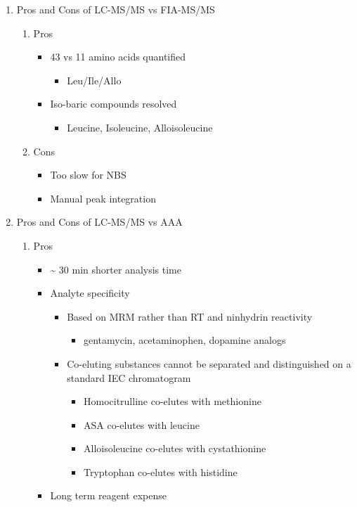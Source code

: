 \documentclass{scrartcl}
\begin{document}
\begin{enumerate}
\item Pros and Cons of LC-MS/MS vs FIA-MS/MS
\label{sec:org7e2c789}
\begin{enumerate}
\item Pros
\label{sec:orga2e049b}
\begin{itemize}
\item 43 vs 11 amino acids quantified
\begin{itemize}
\item Leu/Ile/Allo
\end{itemize}
\item Iso-baric compounds resolved
\begin{itemize}
\item Leucine, Isoleucine, Alloisoleucine
\end{itemize}
\end{itemize}
\item Cons
\label{sec:org9453c33}
\begin{itemize}
\item Too slow for NBS
\item Manual peak integration
\end{itemize}
\end{enumerate}
\item Pros and Cons of LC-MS/MS vs AAA
\label{sec:orgd8c99fc}
\begin{enumerate}
\item Pros
\label{sec:orgb28c6ec}
\begin{itemize}
\item \textasciitilde{} 30 min shorter analysis time
\item Analyte specificity
\begin{itemize}
\item Based on MRM rather than RT and ninhydrin reactivity
\begin{itemize}
\item gentamycin, acetaminophen, dopamine analogs
\end{itemize}
\item Co-eluting substances cannot be separated and distinguished on a
standard IEC chromatogram
\begin{itemize}
\item Homocitrulline co-elutes with methionine
\item ASA co-elutes with leucine
\item Alloisoleucine co-elutes with cystathionine
\item Tryptophan co-elutes with histidine
\end{itemize}
\end{itemize}
\item Long term reagent expense
\end{itemize}


\end{enumerate}
\end{enumerate}
\end{document}
